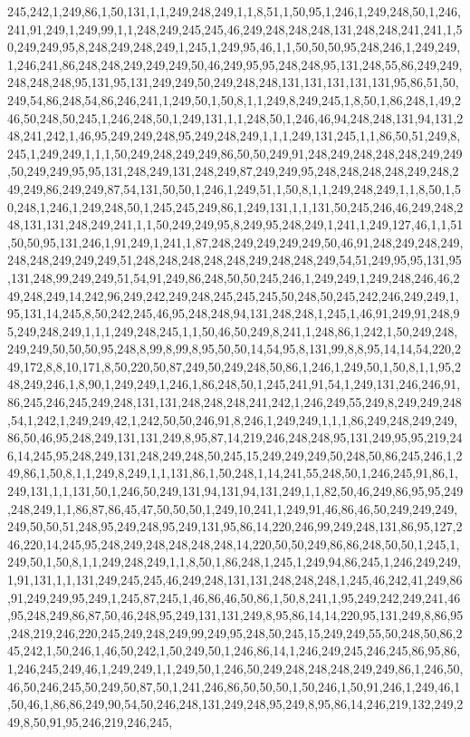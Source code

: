 245,242,1,249,86,1,50,131,1,1,249,248,249,1,1,8,51,1,50,95,1,246,1,249,248,50,1,246,241,91,249,1,249,99,1,1,248,249,245,245,46,249,248,248,248,131,248,248,241,241,1,50,249,249,95,8,248,249,248,249,1,245,1,249,95,46,1,1,50,50,50,95,248,246,1,249,249,1,246,241,86,248,248,249,249,249,50,46,249,95,95,248,248,95,131,248,55,86,249,249,248,248,248,95,131,95,131,249,249,50,249,248,248,131,131,131,131,131,95,86,51,50,249,54,86,248,54,86,246,241,1,249,50,1,50,8,1,1,249,8,249,245,1,8,50,1,86,248,1,49,246,50,248,50,245,1,246,248,50,1,249,131,1,1,248,50,1,246,46,94,248,248,131,94,131,248,241,242,1,46,95,249,249,248,95,249,248,249,1,1,1,249,131,245,1,1,86,50,51,249,8,245,1,249,249,1,1,1,50,249,248,249,249,86,50,50,249,91,248,249,248,248,248,249,249,50,249,249,95,95,131,248,249,131,248,249,87,249,249,95,248,248,248,248,249,248,249,249,86,249,249,87,54,131,50,50,1,246,1,249,51,1,50,8,1,1,249,248,249,1,1,8,50,1,50,248,1,246,1,249,248,50,1,245,245,249,86,1,249,131,1,1,131,50,245,246,46,249,248,248,131,131,248,249,241,1,1,50,249,249,95,8,249,95,248,249,1,241,1,249,127,46,1,1,51,50,50,95,131,246,1,91,249,1,241,1,87,248,249,249,249,249,50,46,91,248,249,248,249,248,248,249,249,249,51,248,248,248,248,248,249,248,248,249,54,51,249,95,95,131,95,131,248,99,249,249,51,54,91,249,86,248,50,50,245,246,1,249,249,1,249,248,246,46,249,248,249,14,242,96,249,242,249,248,245,245,245,50,248,50,245,242,246,249,249,1,95,131,14,245,8,50,242,245,46,95,248,248,94,131,248,248,1,245,1,46,91,249,91,248,95,249,248,249,1,1,1,249,248,245,1,1,50,46,50,249,8,241,1,248,86,1,242,1,50,249,248,249,249,50,50,50,95,248,8,99,8,99,8,95,50,50,14,54,95,8,131,99,8,8,95,14,14,54,220,249,172,8,8,10,171,8,50,220,50,87,249,50,249,248,50,86,1,246,1,249,50,1,50,8,1,1,95,248,249,246,1,8,90,1,249,249,1,246,1,86,248,50,1,245,241,91,54,1,249,131,246,246,91,86,245,246,245,249,248,131,131,248,248,248,241,242,1,246,249,55,249,8,249,249,248,54,1,242,1,249,249,42,1,242,50,50,246,91,8,246,1,249,249,1,1,1,86,249,248,249,249,86,50,46,95,248,249,131,131,249,8,95,87,14,219,246,248,248,95,131,249,95,95,219,246,14,245,95,248,249,131,248,249,248,50,245,15,249,249,249,50,248,50,86,245,246,1,249,86,1,50,8,1,1,249,8,249,1,1,131,86,1,50,248,1,14,241,55,248,50,1,246,245,91,86,1,249,131,1,1,131,50,1,246,50,249,131,94,131,94,131,249,1,1,82,50,46,249,86,95,95,249,248,249,1,1,86,87,86,45,47,50,50,50,1,249,10,241,1,249,91,46,86,46,50,249,249,249,249,50,50,51,248,95,249,248,95,249,131,95,86,14,220,246,99,249,248,131,86,95,127,246,220,14,245,95,248,249,248,248,248,248,14,220,50,50,249,86,86,248,50,50,1,245,1,249,50,1,50,8,1,1,249,248,249,1,1,8,50,1,86,248,1,245,1,249,94,86,245,1,246,249,249,1,91,131,1,1,131,249,245,245,46,249,248,131,131,248,248,248,1,245,46,242,41,249,86,91,249,249,95,249,1,245,87,245,1,46,86,46,50,86,1,50,8,241,1,95,249,242,249,241,46,95,248,249,86,87,50,46,248,95,249,131,131,249,8,95,86,14,14,220,95,131,249,8,86,95,248,219,246,220,245,249,248,249,99,249,95,248,50,245,15,249,249,55,50,248,50,86,245,242,1,50,246,1,46,50,242,1,50,249,50,1,246,86,14,1,246,249,245,246,245,86,95,86,1,246,245,249,46,1,249,249,1,1,249,50,1,246,50,249,248,248,248,249,249,86,1,246,50,46,50,246,245,50,249,50,87,50,1,241,246,86,50,50,50,1,50,246,1,50,91,246,1,249,46,1,50,46,1,86,86,249,90,54,50,246,248,131,249,248,95,249,8,95,86,14,246,219,132,249,249,8,50,91,95,246,219,246,245,